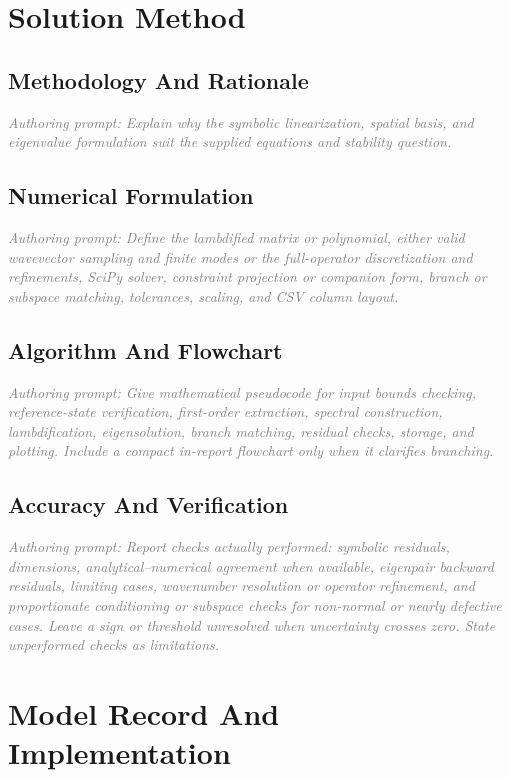 \documentclass[11pt]{article}
\newcommand{\authorprompt}[1]{\textcolor{gray}{\emph{Authoring prompt: #1}}}
\begin{document}
\section{Solution Method}

\subsection{Methodology And Rationale}

\authorprompt{Explain why the symbolic linearization, spatial basis, and eigenvalue formulation suit the supplied equations and stability question.}

\subsection{Numerical Formulation}

\authorprompt{Define the lambdified matrix or polynomial, either valid wavevector sampling and finite modes or the full-operator discretization and refinements, SciPy solver, constraint projection or companion form, branch or subspace matching, tolerances, scaling, and CSV column layout.}

\subsection{Algorithm And Flowchart}

\authorprompt{Give mathematical pseudocode for input bounds checking, reference-state verification, first-order extraction, spectral construction, lambdification, eigensolution, branch matching, residual checks, storage, and plotting. Include a compact in-report flowchart only when it clarifies branching.}

\subsection{Accuracy And Verification}

\authorprompt{Report checks actually performed: symbolic residuals, dimensions, analytical--numerical agreement when available, eigenpair backward residuals, limiting cases, wavenumber resolution or operator refinement, and proportionate conditioning or subspace checks for non-normal or nearly defective cases. Leave a sign or threshold unresolved when uncertainty crosses zero. State unperformed checks as limitations.}

\section{Model Record And Implementation}
\end{document}
